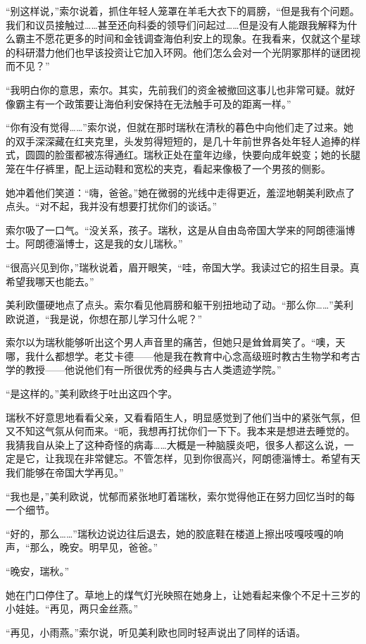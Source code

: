 \documentclass[AutoFakeBold=true]{book}
\begin{document}
``别这样说，''索尔说着，抓住年轻人笼罩在羊毛大衣下的肩膀，``但是我有个问题。我们和议员接触过……甚至还向科委的领导们问起过……但是没有人能跟我解释为什么霸主不愿花更多的时间和金钱调查海伯利安上的现象。在我看来，仅就这个星球的科研潜力他们也早该投资让它加入环网。他们怎么会对一个光阴冢那样的谜团视而不见？''

``我明白你的意思，索尔。其实，先前我们的资金被撤回这事儿也非常可疑。就好像霸主有一个政策要让海伯利安保持在无法触手可及的距离一样。''

``你有没有觉得……''索尔说，但就在那时瑞秋在清秋的暮色中向他们走了过来。她的双手深深藏在红夹克里，头发剪得短短的，是几十年前世界各处年轻人追捧的样式，圆圆的脸蛋都被冻得通红。瑞秋正处在童年边缘，快要向成年蜕变；她的长腿笼在牛仔裤里，配上运动鞋和宽松的夹克，看起来像极了一个男孩的侧影。

她冲着他们笑道：``嗨，爸爸。''她在微弱的光线中走得更近，羞涩地朝美利欧点了点头。``对不起，我并没有想要打扰你们的谈话。''

索尔吸了一口气。``没关系，孩子。瑞秋，这是从自由岛帝国大学来的阿朗德淄博士。阿朗德淄博士，这是我的女儿瑞秋。''

``很高兴见到你，''瑞秋说着，眉开眼笑，``哇，帝国大学。我读过它的招生目录。真希望我哪天也能去。''

美利欧僵硬地点了点头。索尔看见他肩膀和躯干别扭地动了动。``那么你……''美利欧说道，``我是说，你想在那儿学习什么呢？''

索尔以为瑞秋能够听出这个男人声音里的痛苦，但她只是耸耸肩笑了。``噢，天哪，我什么都想学。老艾卡德——他是我在教育中心念高级班时教古生物学和考古学的教授——他说他们有一所很优秀的经典与古人类遗迹学院。''

``是这样的。''美利欧终于吐出这四个字。

瑞秋不好意思地看看父亲，又看看陌生人，明显感觉到了他们当中的紧张气氛，但又不知这气氛从何而来。``呃，我想再打扰你们一下下。我本来是想进去睡觉的。我猜我自从染上了这种奇怪的病毒……大概是一种脑膜炎吧，很多人都这么说，一定是它，让我现在非常健忘。不管怎样，见到你很高兴，阿朗德淄博士。希望有天我们能够在帝国大学再见。''

``我也是，''美利欧说，忧郁而紧张地盯着瑞秋，索尔觉得他正在努力回忆当时的每一个细节。

``好的，那么……''瑞秋边说边往后退去，她的胶底鞋在楼道上擦出吱嘎吱嘎的响声，``那么，晚安。明早见，爸爸。''

``晚安，瑞秋。''

她在门口停住了。草地上的煤气灯光映照在她身上，让她看起来像个不足十三岁的小娃娃。``再见，两只金丝燕。''

``再见，小雨燕。''索尔说，听见美利欧也同时轻声说出了同样的话语。
\end{document}
